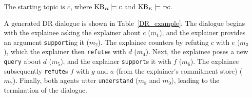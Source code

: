 \documentclass{article}
\begin{document}
\noindent The starting topic is $c$, where $\mathrm{KB}_R \models c$ and $\mathrm{KB}_E \models \neg c$. 


A generated DR dialogue is shown in Table~\ref{DR_example}. The dialogue begins with the explainee asking the explainer about $c$ ($m_1$), and the explainer provides an argument \texttt{support}ing it ($m_2$). The explainee counters by refuting $c$ with $e$ ($m_3$), which the explainer then \texttt{refute}s with $d$ ($m_4$). Next, the explainee poses a new \texttt{query} about $d$ ($m_5$), and the explainer \texttt{support}s it with $f$ ($m_6$). The explainee subsequently \texttt{refute}s $f$ with $g$ and $a$ (from the explainer's commitment store) ($m_7$). Finally, both agents utter \texttt{understand} ($m_8$ and $m_9$), leading to the termination of the dialogue.

\begin{table}
\renewcommand{\arraystretch}{1.2}
\caption{Example of DR dialogue.}
\label{DR_example}
\end{table}
\end{document}
